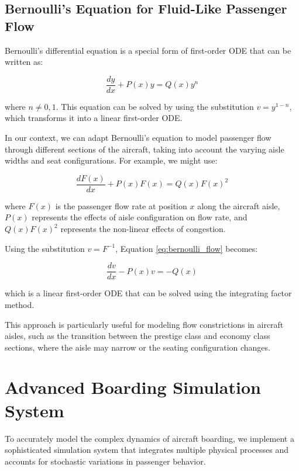 \documentclass[12pt,a4paper]{article}
\begin{document}
\subsection{Bernoulli's Equation for Fluid-Like Passenger Flow}

Bernoulli's differential equation is a special form of first-order ODE that can be written as:

\begin{equation}
\frac{dy}{dx} + P(x)y = Q(x)y^n
\label{eq:bernoulli}
\end{equation}

where $n \neq 0, 1$. This equation can be solved by using the substitution $v = y^{1-n}$, which transforms it into a linear first-order ODE.

In our context, we can adapt Bernoulli's equation to model passenger flow through different sections of the aircraft, taking into account the varying aisle widths and seat configurations. For example, we might use:

\begin{equation}
\frac{dF(x)}{dx} + P(x)F(x) = Q(x)F(x)^2
\label{eq:bernoulli_flow}
\end{equation}

where $F(x)$ is the passenger flow rate at position $x$ along the aircraft aisle, $P(x)$ represents the effects of aisle configuration on flow rate, and $Q(x)F(x)^2$ represents the non-linear effects of congestion.

Using the substitution $v = F^{-1}$, Equation \ref{eq:bernoulli_flow} becomes:

\begin{equation}
\frac{dv}{dx} - P(x)v = -Q(x)
\label{eq:transformed_bernoulli}
\end{equation}

which is a linear first-order ODE that can be solved using the integrating factor method.

This approach is particularly useful for modeling flow constrictions in aircraft aisles, such as the transition between the prestige class and economy class sections, where the aisle may narrow or the seating configuration changes.

\section{Advanced Boarding Simulation System}

To accurately model the complex dynamics of aircraft boarding, we implement a sophisticated simulation system that integrates multiple physical processes and accounts for stochastic variations in passenger behavior.
\end{document}
